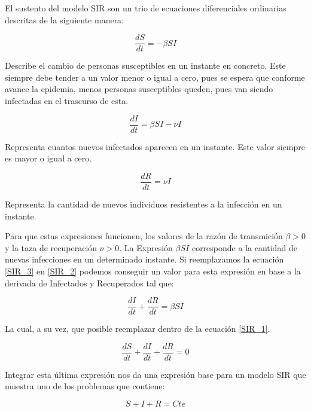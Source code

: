 El sustento del modelo SIR son un trio de ecuaciones diferenciales ordinarias descritas de la siguiente manera:

\begin{equation} \frac{dS}{dt} = -\beta S I \label{SIR_1} \end{equation}

Describe el cambio de personas susceptibles en un instante en concreto. Este siempre debe tender a un valor menor o igual a cero, pues se espera que conforme avance la epidemia, menos personas susceptibles queden, pues van siendo infectadas en el trascurso de esta.

\begin{equation} \frac{dI}{dt} = \beta S I - \nu I \label{SIR_2} \end{equation}

Representa cuantos nuevos infectados aparecen en un instante. Este valor siempre es mayor o igual a cero.

\begin{equation} \frac{dR}{dt} = \nu I \label{SIR_3} \end{equation}

Representa la cantidad de nuevos individuos resistentes a la infección en un instante.

Para que estas expresiones funcionen, los valores de la razón de transmición $ \beta > 0 $ y la taza de recuperación $ \nu > 0 $.
La Expresión $ \beta S I $ corresponde a la cantidad de nuevas infecciones en un determinado instante. Si reemplazamos la ecuación \eqref{SIR_3} en \eqref{SIR_2} podemos conseguir un valor para esta expresión en base a la derivada de Infectados y Recuperados tal que:

\begin{equation} \frac{dI}{dt} + \frac{dR}{dt} = \beta S I \end{equation}

La cual, a su vez, que posible reemplazar dentro de la ecuación \eqref{SIR_1}.

\begin{equation} \frac{dS}{dt} + \frac{dI}{dt} + \frac{dR}{dt} = 0 \end{equation}

Integrar esta última expresión nos da una expresión base para un modelo SIR que muestra uno de los problemas que contiene:

\begin{equation} S + I + R = Cte \end{equation}

